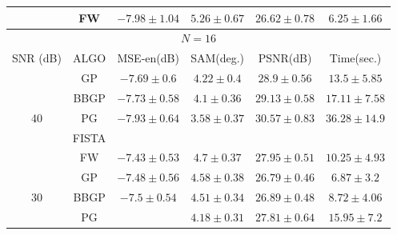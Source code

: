 \begin{table}[h]
{\begin{tabular}{|c|c|c|c|c|c|}
                    & FW     &                   {$-7.98\pm 1.04$} &                   {$5.26\pm 0.67$} &                   {$26.62\pm 0.78$} &                   {$6.25\pm 1.66$}  \tabularnewline \hline
\multicolumn{ 6}{|c|}{$N =16$} \tabularnewline \hline
SNR (dB)            & ALGO   & MSE-en(dB)                          & SAM(deg.)                          & PSNR(dB)                            & Time(sec.)                          \tabularnewline \hline
\multirow{5}{*}{40} & GP     &                   {$-7.69\pm 0.6$}  &                   {$4.22\pm 0.4$}  &                   {$28.9\pm 0.56$}  &                   {$13.5\pm 5.85$}  \tabularnewline
                    & BBGP   &                   {$-7.73\pm 0.58$} &                   {$4.1\pm 0.36$}  &                   {$29.13\pm 0.58$} &                   {$17.11\pm 7.58$} \tabularnewline
                    & PG     &                   {$-7.93\pm 0.64$} &                   {$3.58\pm 0.37$} &                   {$30.57\pm 0.83$} &                   {$36.28\pm 14.9$} \tabularnewline
                    & FISTA  & \cellcolor{red!10}{$-7.94\pm 0.67$} & \cellcolor{red!10}{$3.07\pm 0.54$} & \cellcolor{red!10}{$32.22\pm 1.55$} & \cellcolor{red!10}{$6.46\pm 2.86$}  \tabularnewline
                    & FW     &                   {$-7.43\pm 0.53$} &                   {$4.7\pm 0.37$}  &                   {$27.95\pm 0.51$} &                   {$10.25\pm 4.93$} \tabularnewline \hline \hline
\multirow{5}{*}{30} & GP     &                   {$-7.48\pm 0.56$} &                   {$4.58\pm 0.38$} &                   {$26.79\pm 0.46$} &                   {$6.87\pm 3.2$}   \tabularnewline
                    & BBGP   &                   {$-7.5\pm 0.54$}  &                   {$4.51\pm 0.34$} &                   {$26.89\pm 0.48$} &                   {$8.72\pm 4.06$}  \tabularnewline
                    & PG     & \cellcolor{red!10}{$-7.61\pm 0.54$} &                   {$4.18\pm 0.31$} &                   {$27.81\pm 0.64$} &                   {$15.95\pm 7.2$}  \tabularnewline

\end{tabular}}
\end{table}
